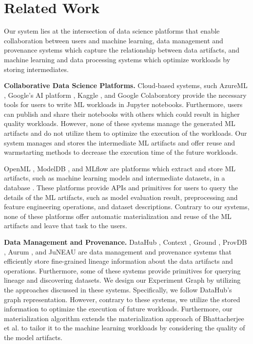 \section{Related Work} \label{sec-related-work}
Our system lies at the intersection of data science platforms that enable collaboration between users and machine learning, data management and provenance systems which capture the relationship between data artifacts, and machine learning and data processing systems which optimize workloads by storing intermediates.

\textbf{Collaborative Data Science Platforms.}
Cloud-based systems, such AzureML \cite{team2016azureml}, Google's AI platform \cite{googleai}, Kaggle \cite{kagglewebsite}, and Google Colaboratory \cite{googlecolab} provide the necessary tools for users to write ML workloads in Jupyter notebooks.
Furthermore, users can publish and share their notebooks with others which could result in higher quality workloads.
However, none of these systems manage the generated ML artifacts and do not utilize them to optimize the execution of the workloads.
Our system manages and stores the intermediate ML artifacts and offer reuse and warmstarting methods to decrease the execution time of the future workloads.

OpenML \cite{vanschoren2014openml}, ModelDB \cite{vartak2016m}, and MLflow \cite{zaharia2018accelerating} are platforms which extract and store ML artifacts, such as machine learning models and intermediate datasets, in a database \cite{schelter2017automatically, Vanschoren2012}.
These platforms provide APIs and primitives for users to query the details of the ML artifacts, such as model evaluation result, preprocessing and feature engineering operations, and dataset descriptions.
Contrary to our systems, none of these platforms offer automatic materialization and reuse of the ML artifacts and leave that task to the users.

\textbf{Data Management and Provenance.}
DataHub \cite{bhardwaj2014datahub, bhattacherjee2015principles}, Context \cite{garcia2018context}, Ground \cite{hellerstein2017ground}, ProvDB \cite{miao2018provdb}, Aurum \cite{fernandez2018aurum}, and JuNEAU \cite{ives2019dataset} are data management and provenance systems that efficiently store fine-grained lineage information about the data artifacts and operations.
Furthermore, some of these systems provide primitives for querying lineage and discovering datasets.
We design our Experiment Graph by utilizing the approaches discussed in these systems.
Specifically, we follow DataHub's graph representation.
However, contrary to these systems, we utilize the stored information to optimize the execution of future workloads.
Furthermore, our materialization algorithm extends the materialization approach of Bhattacherjee et al. \cite{bhattacherjee2015principles} to tailor it to the machine learning workloads by considering the quality of the model artifacts.

